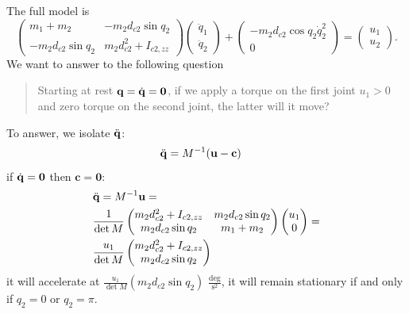 \documentclass[10pt, a4paper]{report}
\newcommand{\q}{{\mathbf q}}
\begin{document}
The full model is\begin{equation}
    \begin{pmatrix}
        m_1+m_2 & -m_2d_{c2}\sin q_2\\ 
       -m_2d_{c2}\sin q_2& m_2d_{c2}^2+I_{c2,zz}
    \end{pmatrix}\begin{pmatrix}
        \ddot q_1\\ \ddot q_2
    \end{pmatrix}+\begin{pmatrix}
       -m_2d_{c2}\cos q_2\dot q_2^2 \\ 0
    \end{pmatrix}=\begin{pmatrix}
        u_1\\ u_2
    \end{pmatrix}.
\end{equation}
We want to answer to the following question\begin{quotation}
    Starting at rest $\q=\dq=\mathbf 0$, if we apply a torque on the first joint $u_1>0$ and zero torque on the second joint, the latter will it move?
\end{quotation}
To answer, we isolate ${\ddot{\mathbf q}}$:\begin{align}
    &{\ddot{\mathbf q}}=M^{-1}(\mathbf u-\mathbf c)
\end{align}
if ${\dot{\mathbf q}}=\mathbf 0$ then $\mathbf c=\mathbf 0$:\begin{align}
    &{\ddot{\mathbf q}}=M^{-1}\mathbf u=\\ 
    &\frac{1}{\det M}\begin{pmatrix}
       m_2d_{c2}^2+I_{c2,zz} & m_2d_{c2}\sin q_2\\ 
       m_2d_{c2}\sin q_2& m_1+m_2
    \end{pmatrix}\begin{pmatrix}
        u_1\\ 0
    \end{pmatrix}=\\ 
    &\frac{u_1}{\det M}\begin{pmatrix}
       m_2d_{c2}^2+I_{c2,zz}\\ 
      m_2d_{c2}\sin q_2
    \end{pmatrix}
\end{align}
it will accelerate at $\frac{u_1}{\det M}( m_2d_{c2}\sin q_2)$ $\frac{\text{deg}}{\text{s}^2}$, it will remain stationary if and only if $q_2=0$ or $q_2=\pi$.\bigskip
\end{document}
